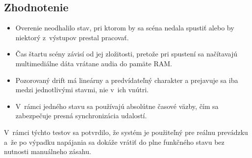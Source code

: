 \subsection{Zhodnotenie}
\begin{itemize}
    \item Overenie neodhalilo stav, pri ktorom by sa scéna nedala spustiť alebo by niektorý z~výstupov prestal pracovať.
    \item Čas štartu scény závisí od jej zložitosti, pretože pri spustení sa načítavajú multimediálne dáta vrátane audia do pamäte RAM.
    \item Pozorovaný drift má lineárny a predvídateľný charakter a prejavuje sa iba medzi jednotlivými stavmi, nie v~ich vnútri.
    \item V~rámci jedného stavu sa používajú absolútne časové väzby, čím sa zabezpečuje presná synchronizácia udalostí.
\end{itemize}

V~rámci týchto testov sa potvrdilo, že systém je použiteľný pre reálnu prevádzku a~že po výpadku napájania sa
dokáže vrátiť do plne funkčného stavu bez nutnosti manuálneho zásahu.
